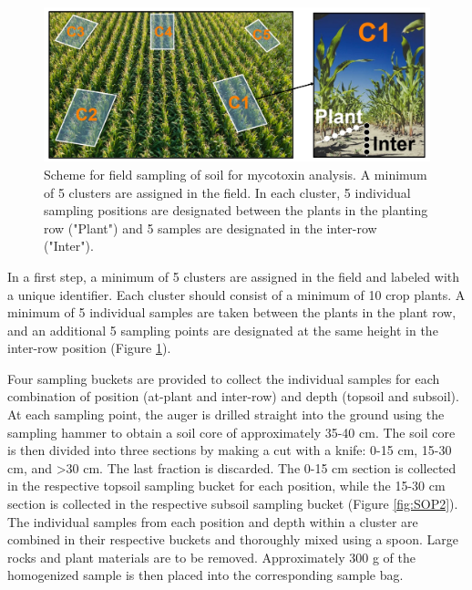 \begin{refsection}
\begin{figure}[b!]
\centering
\includegraphics[width=1\textwidth]{figures/sop_soil sampling 1.jpg}
\decoRule
\captionsetup{labelfont=bf, justification=justified, singlelinecheck=false, width=1\textwidth} 
\caption{Scheme for field sampling of soil for mycotoxin analysis. A minimum of 5 clusters are assigned in the field. In each cluster, 5 individual sampling positions are designated between the plants in the planting row ("Plant") and 5 samples are designated in the inter-row ("Inter").}
\label{fig:SOP1}
\end{figure}

In a first step, a minimum of 5 clusters are assigned in the field and labeled with a unique identifier. Each cluster should consist of a minimum of 10 crop plants. A minimum of 5 individual samples are taken between the plants in the plant row, and an additional 5 sampling points are designated at the same height in the inter-row position (Figure \ref{fig:SOP1}).


Four sampling buckets are provided to collect the individual samples for each combination of position (at-plant and inter-row) and depth (topsoil and subsoil). At each sampling point, the auger is drilled straight into the ground using the sampling hammer to obtain a soil core of approximately 35-40 cm. The soil core is then divided into three sections by making a cut with a knife: 0-15 cm, 15-30 cm, and >30 cm. The last fraction is discarded. The 0-15 cm section is collected in the respective topsoil sampling bucket for each position, while the 15-30 cm section is collected in the respective subsoil sampling bucket (Figure \ref{fig:SOP2}). The individual samples from each position and depth within a cluster are combined in their respective buckets and thoroughly mixed using a spoon. Large rocks and plant materials are to be removed. Approximately 300 g of the homogenized sample is then placed into the corresponding sample bag.


\end{refsection}
